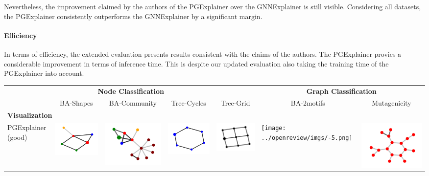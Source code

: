 Nevertheless, the improvement claimed by the authors of the PGExplainer over the GNNExplainer is still visible. Considering all datasets, the PGExplainer consistently outperforms the GNNExplainer by a significant margin. 

\paragraph{Efficiency}
In terms of efficiency, the extended evaluation presents results consistent with the claims of the authors. The PGExplainer provies a considerable improvement in terms of inference time. This is despite our updated evaluation also taking the training time of the PGExplainer into account. 

\begin{table}[]
\centering
\begin{tabular}{lllllll}
\toprule
\multicolumn{5}{c}{\textbf{Node Classification}} & \multicolumn{2}{c}{\textbf{Graph Classification}} \\
\multicolumn{1}{c}{} & \multicolumn{1}{c}{BA-Shapes} & \multicolumn{1}{c}{BA-Community} & \multicolumn{1}{c}{Tree-Cycles} & \multicolumn{1}{c|}{Tree-Grid} & \multicolumn{1}{c}{BA-2motifs} & \multicolumn{1}{c}{Mutagenicity} \\ \hline
\multicolumn{7}{l}{\textbf{Visualization}} \\ \hline
PGExplainer (good) &  \includegraphics[width=.1\linewidth]{../openreview/imgs/extension/pg/syn1_good.png}
& \includegraphics[width=.1\linewidth]{../openreview/imgs/extension/pg/syn2_good.png} & \includegraphics[width=.1\linewidth]{../openreview/imgs/extension/pg/syn3_good.png} & \multicolumn{1}{l|}{\includegraphics[width=.1\linewidth]{../openreview/imgs/extension/pg/syn4_good.png}} & \texttt{[image: ../openreview/imgs/-5.png]} & \includegraphics[width=.1\linewidth]{../openreview/imgs/extension/gnn/mutag_good.png} \\

\end{tabular}
\end{table}
